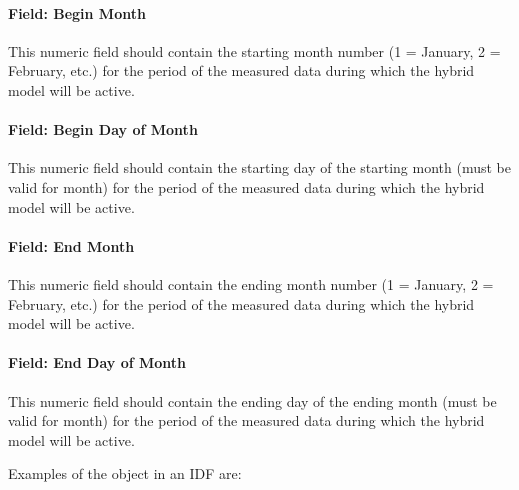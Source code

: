 \paragraph{Field: Begin Month}\label{field-begin-month-hm}

This numeric field should contain the starting month number (1 = January, 2 = February, etc.) for the period of the measured data during which the hybrid model will be active.

\paragraph{Field: Begin Day of Month}\label{field-begin-day-of-month-hm}

This numeric field should contain the starting day of the starting month (must be valid for month) for the period of the measured data during which the hybrid model will be active.

\paragraph{Field: End Month}\label{field-end-month-hm}

This numeric field should contain the ending month number (1 = January, 2 = February, etc.) for the period of the measured data during which the hybrid model will be active.

\paragraph{Field: End Day of Month}\label{field-end-day-of-month-hm}

This numeric field should contain the ending day of the ending month (must be valid for month) for the period of the measured data during which the hybrid model will be active.

Examples of the object in an IDF are:

